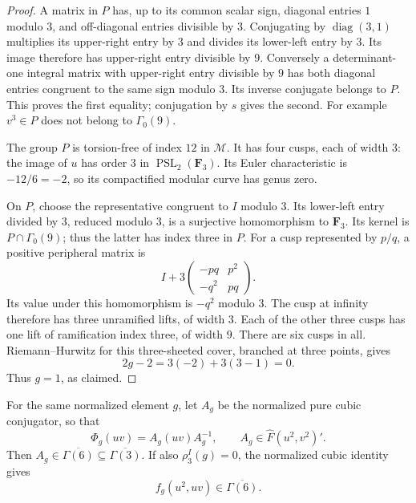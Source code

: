 \begin{proof}
A matrix in \(P\) has, up to its common scalar sign, diagonal
entries \(1\) modulo \(3\), and off-diagonal entries divisible
by \(3\). Conjugating by \(\operatorname{diag}(3,1)\)
multiplies its upper-right entry by \(3\) and divides its
lower-left entry by \(3\). Its image therefore has upper-right
entry divisible by \(9\).
Conversely a determinant-one integral matrix with upper-right
entry divisible by \(9\) has both diagonal entries congruent
to the same sign modulo \(3\). Its inverse conjugate belongs
to \(P\). This proves the first equality; conjugation by \(s\)
gives the second. For example \(v^3\in P\) does not belong
to \(\Gamma_0(9)\).

The group \(P\) is torsion-free of index \(12\) in \(\mathcal M\).
It has four cusps, each of width \(3\): the image of \(u\)
has order \(3\) in \(\operatorname{PSL}_2(\mathbf F_3)\).
Its Euler characteristic is \(-12/6=-2\), so its compactified
modular curve has genus zero.

On \(P\), choose the representative congruent to \(I\)
modulo \(3\). Its lower-left entry divided by \(3\), reduced
modulo \(3\), is a surjective homomorphism to
\(\mathbf F_3\). Its kernel is \(P\cap\Gamma_0(9)\);
thus the latter has index three in \(P\).
For a cusp represented by \(p/q\), a positive peripheral
matrix is
\[
 I+3\begin{pmatrix}-pq&p^2\\-q^2&pq\end{pmatrix}.
\]
Its value under this homomorphism is \(-q^2\) modulo \(3\).
The cusp at infinity therefore has three unramified lifts,
of width \(3\). Each of the other three cusps has one lift
of ramification index three, of width \(9\).
There are six cusps in all. Riemann--Hurwitz for this
three-sheeted cover, branched at three points, gives
\[
 2g-2=3(-2)+3(3-1)=0.
\]
Thus \(g=1\), as claimed.
\end{proof}

\begin{lemma}\label{lem:level3-cubic-frame-principal}
For the same normalized element \(g\), let \(A_g\) be the
normalized pure cubic conjugator, so that
\[
 \Phi_g(uv)=A_g(uv)A_g^{-1},\qquad
 A_g\in\widehat F(u^2,v^2)'.
\]
Then \(A_g\in\overline{\Gamma(6)}\subseteq\overline{\Gamma(3)}\).
If also \(\rho_3^I(g)=0\), the normalized cubic identity gives
\[
 f_g(u^2,uv)\in\overline{\Gamma(6)}.
\]
\end{lemma}

